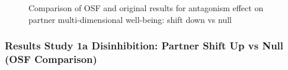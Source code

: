 \documentclass[
  singlecolumn]{article}
\begin{document}
\begin{figure}


\caption{\label{fig-results-antagonism-partner-down-comparison}Comparison
of OSF and original results for antagonism effect on partner
multi-dimensional well-being: shift down vs null}

\end{figure}%

\newpage{}

\subsubsection{Results Study 1a Disinhibition: Partner Shift Up vs Null
(OSF
Comparison)}\label{results-study-1a-disinhibition-partner-shift-up-vs-null-osf-comparison}
\end{document}
